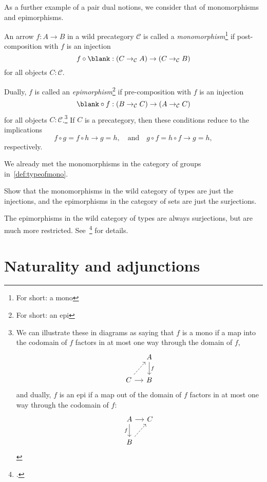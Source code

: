As a further example of a pair dual notions, we consider that of
monomorphisms and epimorphisms.
\begin{definition}
  An arrow $f : A \to B$ in a wild precategory $\mathcal C$
  is called a \emph{monomorphism}\footnote{For short: a mono} if
  post-composition with $f$ is an injection
  \[
    f\circ\blank : (C \to_{\mathcal C} A) \to (C \to_{\mathcal C} B)
  \]
  for all objects $C:\mathcal C$.

  Dually, $f$ is called an \emph{epimorphism}\footnote{For short: an epi}
  if pre-composition with $f$ is an injection
  \[
    \blank\circ f : (B \to_{\mathcal C} C) \to (A \to_{\mathcal C} C)
  \]
  for all objects $C:\mathcal C$.\footnote{%
    We can illustrate these in diagrams as saying that
    $f$ is a mono if a map into the codomain of $f$ factors in
    at most one way through the domain of $f$,
    \[
      \begin{tikzcd}[ampersand replacement=\&,column sep=small]
        \& A \ar[d,"f"] \\
        C \ar[ur,dashed]\ar[r] \& B
      \end{tikzcd}
    \]
    and dually, $f$ is an epi if a map out of the domain of $f$
    factors in at most one way through the codomain of $f$:
    \[
      \begin{tikzcd}[ampersand replacement=\&,column sep=small]
        A \ar[d,"f"']\ar[r] \& C \\
        B \ar[ur,dashed]
      \end{tikzcd}
    \]}
  If $C$ is a precategory, then these conditions reduce to the implications
  \[
    f\circ g=f\circ h \to g=h, \quad\text{and}\quad g\circ f=h\circ f \to g=h,
  \]
  respectively.
\end{definition}
We already met the monomorphisms in the category of groups in~\cref{def:typeofmono}.
\begin{xca}
  Show that the monomorphisms in the wild category of types are just the injections,
  and the epimorphisms in the category of sets are just the surjections.
\end{xca}
The epimorphisms in the wild category of types are always surjections,
but are much more restricted. See~\citeauthor{BdJR2025}\footcite{BdJR2025} for details.

\section{Naturality and adjunctions}
\label{sec:naturality}

